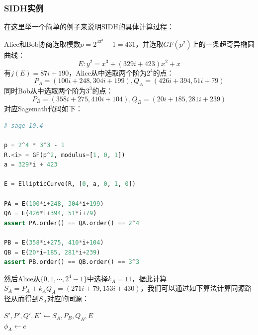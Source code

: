 \documentclass{book}
\numberwithin{equation}{subsubsection}
\begin{document}
\subsubsection{SIDH实例\cite{25}}
在这里举一个简单的例子来说明SIDH的具体计算过程：\par
Alice和Bob协商选取模数$p=2^43^3-1=431$，并选取$GF(p^2)$上的一条超奇异椭圆曲线：
\begin{equation}
    E:y^2=x^3+(329i+423)x^2+x
    \nonumber
\end{equation}
有$j(E)=87i+190$，Alice从中选取两个阶为$2^4$的点：
\begin{equation}
    P_A=(100i+248,304i+199),Q_A=(426i+394,51i+79)
    \nonumber
\end{equation}
同时Bob从中选取两个阶为$3^3$的点：
\begin{equation}
    P_B = (358i+275, 410i+104),Q_B = (20i+185, 281i+239)
    \nonumber
\end{equation}
对应Sagemath代码如下：
\begin{lstlisting}[language=Python,basicstyle=\ttfamily,breaklines=true,keywordstyle=\bfseries\color{blue}]
# sage 10.4

p = 2^4 * 3^3 - 1
R.<i> = GF(p^2, modulus=[1, 0, 1])
a = 329*i + 423

E = EllipticCurve(R, [0, a, 0, 1, 0])

PA = E(100*i+248, 304*i+199)
QA = E(426*i+394, 51*i+79)
assert PA.order() == QA.order() == 2^4

PB = E(358*i+275, 410*i+104)
QB = E(20*i+185, 281*i+239)
assert PB.order() == QB.order() == 3^3
\end{lstlisting}
然后Alice从$\{0,1,\cdots,2^4-1\}$中选择$k_A=11$，据此计算$S_A=P_A+k_AQ_A=(271i + 79, 153i + 430)$，我们可以通过如下算法计算同源路径从而得到$S_A$对应的同源：
\begin{algorithm}[h!]
    \caption{同源路径算法（Alice侧）}
    $S',P',Q',E'\leftarrow S_A,P_B,Q_B,E$\\
    $\phi_A\leftarrow e$
\end{algorithm}\\
\end{document}
